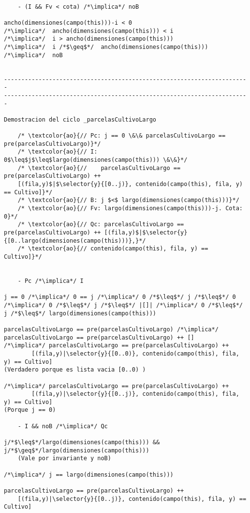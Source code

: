 \begin{lstlisting}
	
    - (I && Fv < cota) /*\implica*/ noB
    
ancho(dimensiones(campo(this)))-i < 0
/*\implica*/  ancho(dimensiones(campo(this))) < i
/*\implica*/  i > ancho(dimensiones(campo(this)))
/*\implica*/  i /*$\geq$*/  ancho(dimensiones(campo(this))) /*\implica*/  noB

	
-----------------------------------------------------------------------
-----------------------------------------------------------------------

Demostracion del ciclo _parcelasCultivoLargo

    /* \textcolor{ao}{// Pc: j == 0 \&\& parcelasCultivoLargo == pre(parcelasCultivoLargo)}*/      
    /* \textcolor{ao}{// I: 0$\leq$j$\leq$largo(dimensiones(campo(this))) \&\&}*/        
    /* \textcolor{ao}{//    parcelasCultivoLargo == pre(parcelasCultivoLargo) ++ 
    [(fila,y)$|$\selector{y}{[0..j)}, contenido(campo(this), fila, y) == Cultivo]}*/ 
    /* \textcolor{ao}{// B: j $<$ largo(dimensiones(campo(this)))}*/
	/* \textcolor{ao}{// Fv: largo(dimensiones(campo(this)))-j. Cota: 0}*/     
    /* \textcolor{ao}{// Qc: parcelasCultivoLargo == pre(parcelasCultivoLargo) ++ [(fila,y)$|$\selector{y}{[0..largo(dimensiones(campo(this)))},}*/
    /* \textcolor{ao}{// contenido(campo(this), fila, y) == Cultivo]}*/      


    - Pc /*\implica*/ I
   
j == 0 /*\implica*/ 0 == j /*\implica*/ 0 /*$\leq$*/ j /*$\leq$*/ 0
/*\implica*/ 0 /*$\leq$*/ j /*$\leq$*/ |[]| /*\implica*/ 0 /*$\leq$*/ j /*$\leq$*/ largo(dimensiones(campo(this)))

parcelasCultivoLargo == pre(parcelasCultivoLargo) /*\implica*/ parcelasCultivoLargo == pre(parcelasCultivoLargo) ++ []
/*\implica*/ parcelasCultivoLargo == pre(parcelasCultivoLargo) ++ 
		[(fila,y)|\selector{y}{[0..0)}, contenido(campo(this), fila, y) == Cultivo]
(Verdadero porque es lista vacia [0..0) )

/*\implica*/ parcelasCultivoLargo == pre(parcelasCultivoLargo) ++ 
		[(fila,y)|\selector{y}{[0..j)}, contenido(campo(this), fila, y) == Cultivo]    
(Porque j == 0)

    - I && noB /*\implica*/ Qc

j/*$\leq$*/largo(dimensiones(campo(this))) && j/*$\geq$*/largo(dimensiones(campo(this)))
	(Vale por invariante y noB)

/*\implica*/ j == largo(dimensiones(campo(this)))

parcelasCultivoLargo == pre(parcelasCultivoLargo) ++ 
    [(fila,y)|\selector{y}{[0..j)}, contenido(campo(this), fila, y) == Cultivo]
  

\end{lstlisting}
